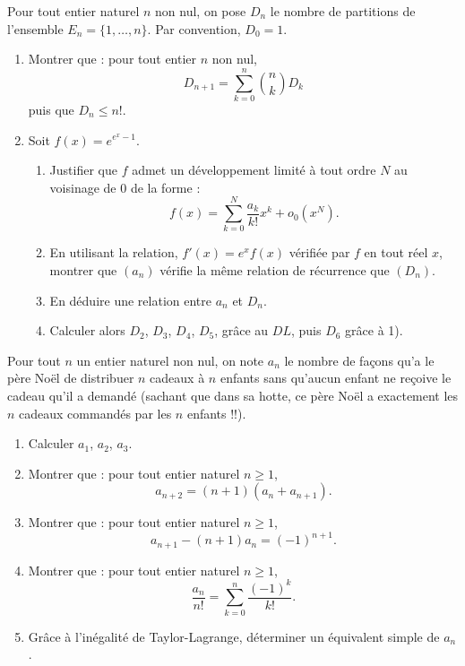 \documentclass[../PolyS4.tex]{subfiles}
\begin{document}
   \newpage


Pour tout entier naturel $n$ non nul, on pose $D_n$ le nombre de partitions de l'ensemble $E_n = \{1, \ldots, n\}$. Par convention, $D_0 = 1$.\\

\begin{enumerate}
    \item Montrer que : pour tout entier $n$ non nul, 
    \[
    D_{n+1} = \sum_{k=0}^{n} \binom{n}{k} D_k
    \]
    puis que $D_n \leq n!$.
    
    \item Soit $f(x) = e^{e^x - 1}$.
    \begin{enumerate}
        \item Justifier que $f$ admet un développement limité à tout ordre $N$ au voisinage de 0 de la forme : 
        \[
        f(x) = \sum_{k=0}^{N} \frac{a_k}{k!} x^k + o_0(x^N).
        \]
        \item En utilisant la relation, $f'(x) = e^x f(x)$ vérifiée par $f$ en tout réel $x$, montrer que $(a_n)$ vérifie la même relation de récurrence que $(D_n)$.
        \item En déduire une relation entre $a_n$ et $D_n$.
        \item Calculer alors $D_2$, $D_3$, $D_4$, $D_5$, grâce au $DL$, puis $D_6$ grâce à 1).\\
    \end{enumerate}
\end{enumerate}





Pour tout $n$ un entier naturel non nul, on note $a_n$ le nombre de façons qu'a le père Noël de distribuer $n$ cadeaux à $n$ enfants sans qu'aucun enfant ne reçoive le cadeau qu'il a demandé (sachant que dans sa hotte, ce père Noël a exactement les $n$ cadeaux commandés par les $n$ enfants !!).\\

\begin{enumerate}
    \item Calculer $a_1$, $a_2$, $a_3$.
    \item Montrer que : pour tout entier naturel $n \geq 1$,
    \[
    a_{n+2} = (n + 1)(a_n + a_{n+1}).
    \]
    \item Montrer que : pour tout entier naturel $n \geq 1$,
    \[
    a_{n+1} - (n + 1)a_n = (-1)^{n+1}.
    \]
    \item Montrer que : pour tout entier naturel $n \geq 1$,
    \[
    \frac{a_n}{n!} = \sum_{k=0}^{n} \frac{(-1)^k}{k!}.
    \]
    \item Grâce à l'inégalité de Taylor-Lagrange, déterminer un équivalent simple de $a_n$.\\
\end{enumerate}
\end{document}
